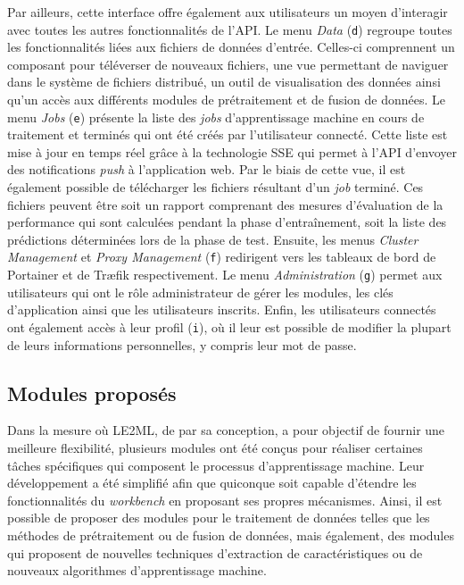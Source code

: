 Par ailleurs, cette interface offre également aux utilisateurs un moyen d'interagir avec toutes les autres fonctionnalités de l'\acs{API}. Le menu \textit{Data} (\texttt{d}) regroupe toutes les fonctionnalités liées aux fichiers de données d'entrée. Celles-ci comprennent un composant pour téléverser de nouveaux fichiers, une vue permettant de naviguer dans le système de fichiers distribué, un outil de visualisation des données ainsi qu'un accès aux différents modules de prétraitement et de fusion de données. Le menu \textit{Jobs} (\texttt{e}) présente la liste des \textit{jobs} d'apprentissage machine en cours de traitement et terminés qui ont été créés par l'utilisateur connecté. Cette liste est mise à jour en temps réel grâce à la technologie \ac{SSE} qui permet à l'\acs{API} d'envoyer des notifications \textit{push} à l'application web. Par le biais de cette vue, il est également possible de télécharger les fichiers résultant d'un \textit{job} terminé. Ces fichiers peuvent être soit un rapport comprenant des mesures d'évaluation de la performance qui sont calculées pendant la phase d'entraînement, soit la liste des prédictions déterminées lors de la phase de test. Ensuite, les menus \textit{Cluster Management} et \textit{Proxy Management} (\texttt{f}) redirigent vers les tableaux de bord de Portainer et de Tr\ae{}fik respectivement. Le menu \textit{Administration} (\texttt{g}) permet aux utilisateurs qui ont le rôle administrateur de gérer les modules, les clés d'application ainsi que les utilisateurs inscrits. Enfin, les utilisateurs connectés ont également accès à leur profil (\texttt{i}), où il leur est possible de modifier la plupart de leurs informations personnelles, y compris leur mot de passe.

\subsection{Modules proposés}

Dans la mesure où \acs{LE2ML}, de par sa conception, a pour objectif de fournir une meilleure flexibilité, plusieurs modules ont été conçus pour réaliser certaines tâches spécifiques qui composent le processus d'apprentissage machine. Leur développement a été simplifié afin que quiconque soit capable d'étendre les fonctionnalités du \textit{workbench} en proposant ses propres mécanismes. Ainsi, il est possible de proposer des modules pour le traitement de données telles que les méthodes de prétraitement ou de fusion de données, mais également, des modules qui proposent de nouvelles techniques d'extraction de caractéristiques ou de nouveaux algorithmes d'apprentissage machine.

